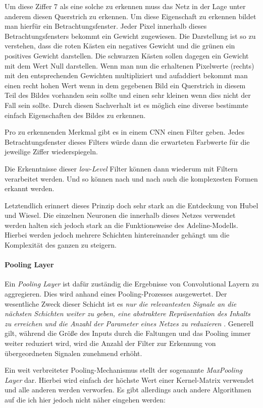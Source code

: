 Um diese Ziffer 7 als eine solche zu erkennen muss das Netz in der Lage unter anderem diesen Querstrich zu erkennen. Um diese Eigenschaft zu erkennen bildet man hierfür ein Betrachtungsfenster. Jeder Pixel innerhalb dieses Betrachtungsfensters bekommt ein Gewicht zugewiesen. Die Darstellung ist so zu verstehen, dass die roten Kästen ein negatives Gewicht und die grünen ein positives Gewicht darstellen. Die schwarzen Kästen sollen dagegen ein Gewicht mit dem Wert Null darstellen. Wenn man nun die erhaltenen Pixelwerte (rechts) mit den entsprechenden Gewichten multipliziert und aufaddiert bekommt man einen recht hohen Wert wenn in dem gegebenen Bild ein Querstrich in diesem Teil des Bildes vorhanden sein sollte und einen sehr kleinen wenn dies nicht der Fall sein sollte. Durch diesen Sachverhalt ist es möglich eine diverse bestimmte einfach Eigenschaften des Bildes zu erkennen.  

Pro zu erkennenden Merkmal gibt es in einem CNN einen Filter geben. Jedes Betrachtungsfenster dieses Filters würde dann die erwarteten Farbwerte für die jeweilige Ziffer wiederspiegeln. 

Die Erkenntnisse dieser \emph{low-Level} Filter können dann wiederum mit Filtern verarbeitet werden. Und so können nach und nach auch die komplexesten Formen erkannt werden. 

Letztendlich erinnert dieses Prinzip doch sehr stark an die Entdeckung von Hubel und Wiesel. Die einzelnen Neuronen die innerhalb dieses Netzes verwendet werden halten sich jedoch stark an die Funktionsweise des Adeline-Modells. Hierbei werden jedoch mehrere Schichten hintereinander gehängt um die Komplexität des ganzen zu steigern. 

\paragraph{Pooling Layer}
Ein \emph{Pooling Layer} ist dafür zuständig die Ergebnisse von Convolutional Layern zu aggregieren. Dies wird anhand eines Pooling-Prozesses ausgewertet. Der wesentliche Zweck dieser Schicht ist es \emph{nur die relevantesten Signale an die nächsten Schichten weiter zu geben, eine abstraktere Repräsentation des Inhalts zu erreichen und die Anzahl der Parameter eines Netzes zu reduzieren} \cite{cnnFunktionsweise2}. Generell gilt, während die Größe des Inputs durch die Faltungen und das Pooling immer weiter reduziert wird, wird die Anzahl der Filter zur Erkennung von übergeordneten Signalen zunehmend erhöht.

Ein weit verbreiteter Pooling-Mechanismus stellt der sogenannte \emph{MaxPooling Layer} dar. Hierbei wird einfach der höchste Wert einer Kernel-Matrix verwendet und alle anderen werden verworfen. Es gibt allerdings auch andere Algorithmen auf die ich hier jedoch nicht näher eingehen werden: 

